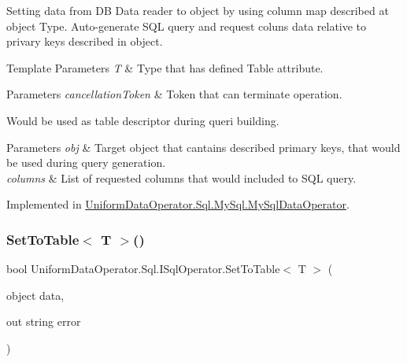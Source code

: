 Setting data from DB Data reader to object by using column map described at object Type. Auto-\/generate S\+QL query and request coluns data relative to privary keys described in object. 


\begin{DoxyTemplParams}{Template Parameters}
{\em T} & Type that has defined Table attribute. 
\begin{DoxyParams}{Parameters}
{\em cancellation\+Token} & Token that can terminate operation.\\
\hline
\end{DoxyParams}
Would be used as table descriptor during queri building.\\
\hline
\end{DoxyTemplParams}

\begin{DoxyParams}{Parameters}
{\em obj} & Target object that cantains described primary keys, that would be used during query generation.\\
\hline
{\em columns} & List of requested columns that would included to S\+QL query.\\
\hline
\end{DoxyParams}


Implemented in \mbox{\hyperlink{class_uniform_data_operator_1_1_sql_1_1_my_sql_1_1_my_sql_data_operator_ae3b550f82c725fa4f17d71f5f489dc10}{Uniform\+Data\+Operator.\+Sql.\+My\+Sql.\+My\+Sql\+Data\+Operator}}.

\mbox{\label{interface_uniform_data_operator_1_1_sql_1_1_i_sql_operator_a1072f029395858ff11d574ac09011332}} 
\subsubsection{\texorpdfstring{Set\+To\+Table$<$ T $>$()}{SetToTable< T >()}}
{\footnotesize\ttfamily bool Uniform\+Data\+Operator.\+Sql.\+I\+Sql\+Operator.\+Set\+To\+Table$<$ T $>$ (\begin{DoxyParamCaption}\item[{object}]{data,  }\item[{out string}]{error }\end{DoxyParamCaption})}



